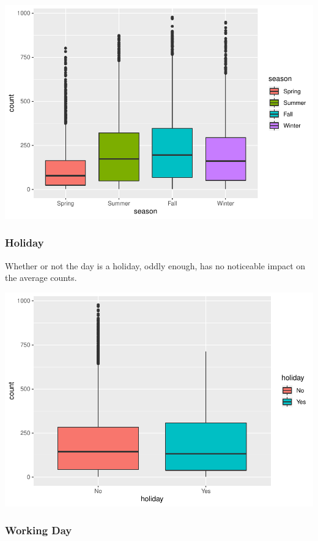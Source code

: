 \documentclass[american,]{article}
\begin{document}
\includegraphics{BikeSharingDemand_files/figure-latex/train.mod.1.season-1.pdf}

\newpage

\hypertarget{holiday}{%
\subsubsection{Holiday}\label{holiday}}

Whether or not the day is a holiday, oddly enough, has no noticeable impact on the average counts.

\includegraphics{BikeSharingDemand_files/figure-latex/train.mod.1.holiday-1.pdf}

\newpage

\hypertarget{working-day}{%
\subsubsection{Working Day}\label{working-day}}
\end{document}
